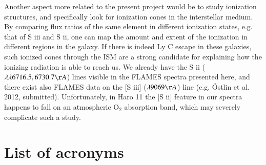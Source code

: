 \documentclass[a4wide,12pt]{book}
\begin{document}
{Another aspect more related to the present project would be to study ionization structures, and specifically look for ionization cones in the interstellar medium. By comparing flux ratios of the same element in different ionization states, e.g. that of S {\sc iii} and S {\sc ii}, one can map the amount and extent of the ionization in different regions in the galaxy. If there is indeed Ly C escape in these galaxies, such ionized cones through the ISM are a strong candidate for explaining how the ionizing radiation is able to reach us. We already have the S {\sc ii} ($\lambda \lambda 6716.5, 6730.7 \AA$) lines visible in the FLAMES spectra presented here, and there exist also FLAMES data on the [S {\sc iii}] ($\lambda 9069 \AA$) line (e.g. \"{O}stlin et al. 2012, submitted). Unfortunately, in Haro 11 the [S {\sc ii}] feature in our spectra happens to fall on an atmospheric $\mathrm{O_2}$ absorption band, which may severely complicate such a study. 

\clearpage

\chapter*{List of acronyms}

}
\end{document}
